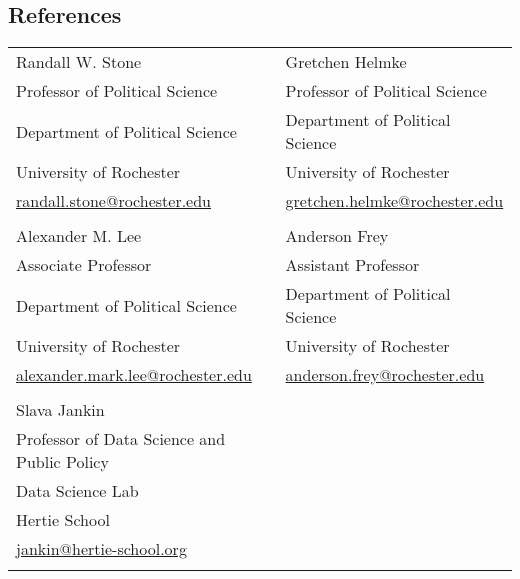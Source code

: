 \documentclass[margin,line,10.95pt]{res}
\begin{document}
\begin{resume}
\section{\sc References}
\hskip 18pt
\begin{tabular}{ll}
	Randall W. Stone                   & Gretchen Helmke  \\
	Professor of Political Science              & Professor of Political Science\\
	Department of Political Science     & Department of Political Science  \\
	University of Rochester             & University of Rochester \\
\href{mailto:randall.stone@rochester.edu}{randall.stone@rochester.edu}& \href{mailto:gretchen.helmke@rochester.edu}{gretchen.helmke@rochester.edu}\\
\\
	Alexander M. Lee                     & Anderson Frey  \\
	Associate Professor                 & Assistant Professor\\
	Department of Political Science     & Department of Political Science  \\
	University of Rochester             & University of Rochester \\
 \href{mailto:alexander.mark.lee@rochester.edu}{alexander.mark.lee@rochester.edu}&
 	\href{mailto:anderson.frey@rochester.edu}{anderson.frey@rochester.edu}\\
 	\\
 		Slava Jankin                   & \\
 	Professor of Data Science and Public Policy              & \\
 	Data Science Lab     &   \\
 	Hertie School             &  \\
 	\href{mailto:jankin@hertie-school.org}{jankin@hertie-school.org}& \\
 	\\
\end{tabular}



\thispagestyle{updated}

\end{resume}
\end{document}
